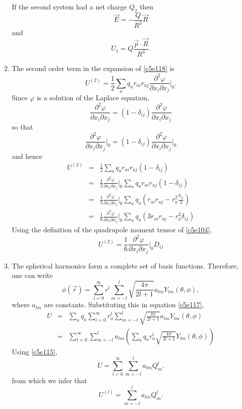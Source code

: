 \begin{enumerate}
If the second system had a net charge $Q_2$ then
\[
\vec{E} = -\frac{Q}{R^3}\vec{R}
\]
and
\begin{equation}\label{c5e126}
U_1 = Q\frac{\vec{p}\cdot\vec{R}}{R^3}.
\end{equation}

\item The second order term in the expansion of \eqref{c5e118} is
\[
U^{(2)} = \frac{1}{2}\sum_a q_a r_{ai}r_{aj}\frac{\partial^2\varphi}
{\partial x_i\partial x_j}\Big|_0.
\]
Since $\varphi$ is a solution of the Laplace equation,
\[
\frac{\partial^2\varphi}{\partial x_i\partial x_j} = 
(1 - \delta_{ij})\frac{\partial^2\varphi}{\partial x_i\partial x_j}
\]
so that
\[
\frac{\partial^2\varphi}{\partial x_i\partial x_j}\Big|_0 = 
(1 - \delta_{ij})\frac{\partial^2\varphi}{\partial x_i\partial x_j}\Big|_0
\]
and hence
\begin{eqnarray*}
U^{(2)} &=& \frac{1}{2}\sum_a q_a r_{ai}r_{aj}(1 - \delta_{ij}) \\
 &=& \frac{1}{2}\frac{\partial^2\varphi}{\partial x_i\partial x_j}\Big|_0
 	\sum_a q_a r_{ai}r_{aj}(1 - \delta_{ij}) \\
 &=& \frac{1}{2}\frac{\partial^2\varphi}{\partial x_i\partial x_j}\Big|_0
 	\sum_a q_a (r_{ai}r_{aj} - r_a^2\frac{\delta_{ij}}{3}) \\
 &=& \frac{1}{6}\frac{\partial^2\varphi}{\partial x_i\partial x_j}\Big|_0
 	\sum_a q_a (3r_{ai}r_{aj} - r_a^2\delta_{ij})
\end{eqnarray*}
Using the definition of the quadrupole moment tensor of \eqref{c5e104},
\begin{equation}\label{c5e127}
U^{(2)} = \frac{1}{6}\frac{\partial^2\varphi}{\partial x_i\partial x_j}\Big|_0
D_{ij}
\end{equation}

\item The spherical harmonics form a complete set of basis functions. Therefore,
one can write
\begin{equation}\label{c5e128}
\phi(\vec{r}) = \sum_{l=0}^\infty r^l\sum_{m=-l}^l
\sqrt{\frac{4\pi}{2l+1}}a_{lm}Y_{lm}(\theta,\phi),
\end{equation}
where $a_{lm}$ are constants. Substituting this in equation \eqref{c5e117},
\begin{eqnarray*}
U &=& \sum_a q_a\sum_{l=0}^\infty r_a^l\sum_{m=-l}^l
	\sqrt{\frac{4\pi}{2l+1}}a_{lm}Y_{lm}(\theta,\phi) \\
  &=& \sum_{l=0}^\infty\sum_{m=-l}^l a_{lm}
  \left(\sum_a q_ar_a^l\sqrt{\frac{4\pi}{2l+1}}Y_{lm}(\theta,\phi)\right)
\end{eqnarray*}
Using \eqref{c5e115},
\[
U = \sum_{l=0}^\infty\sum_{m=-l}^l a_{lm}Q_m^l.
\]
from which we infer that
\begin{equation}\label{c5e129}
U^{(l)} = \sum_{m=-l}^l a_{lm}Q_m^l.
\end{equation}


\end{enumerate}
